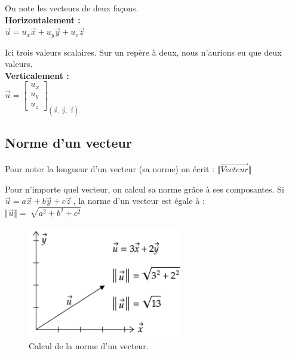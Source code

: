\documentclass[
	11pt, %
	fleqn, %
	a4paper, %
]{LegrandOrangeBook}
\begin{document}
On note les vecteurs de deux façons. \\


\textbf{Horizontalement :} \\


$\Vec{u}= u_x \Vec{x} + u_y \Vec{y} + u_z \Vec{z} $

Ici trois valeurs scalaires. Sur un repère à deux, nous n'aurions eu que deux valeurs. \\

\textbf{Verticalement :} \\

$\vec{u} =\begin{bmatrix}
u_{x}\\
u_{y}\\
u_{z}
\end{bmatrix}_{(\vec{x} ,\ \vec{y} ,\ \vec{z})}$






\subsection{Norme d'un vecteur}
Pour noter la longueur d'un vecteur (sa norme) on écrit : $\Vert \overrightarrow{Vecteur}\Vert \ $

Pour n'importe quel vecteur, on calcul sa norme grâce à ses composantes. Si $ \overrightarrow{u} = a \vec{x} + b \vec{y} + c \vec{z} \ $, la norme d'un vecteur est égale à :\\
$\Vert \overrightarrow{u}\Vert =\ \sqrt{a^2 + b^2 + c^2} $

\begin{figure}[H] %
	\centering %
	\includegraphics[width=0.6\textwidth]{Images/norme3.png} %
	\caption{Calcul de la norme d'un vecteur.}
	\label{norme3} %
\end{figure}
\end{document}
